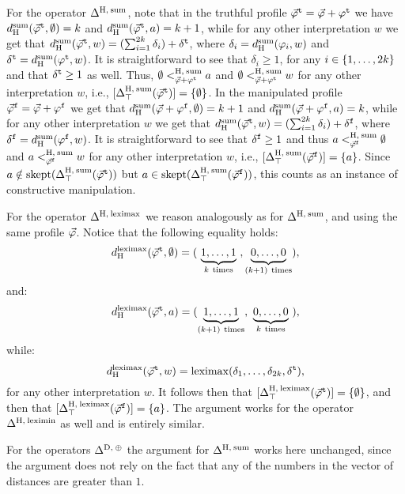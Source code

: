 \begin{prf*}{}{}
	For the operator $\me^{\hamming,\:\ssum}$,
	note that in the truthful profile $\truth{\P}=\P+\truth{\phi}$ we have 
	$\dd_{\hamming}^\ssum(\truth{\P},\emptyset)=k$ and 
	$\dd_{\hamming}^\ssum(\truth{\P},a)=k+1$,
	while for any other interpretation $w$ we get that 
	$\dd_{\hamming}^\ssum(\truth{\P},w)=(\sum_{i=1}^{2k}\delta_i)+\truth{\delta}$,
	where $\delta_i=\dd_{\hamming}^\ssum(\phi_i,w)$ 
	and $\truth{\delta}=\dd_{\hamming}^\ssum(\truth{\phi},w)$.
	It is straightforward to see that $\delta_i\geq 1$, 
	for any $i\in\set{1,\dots,2k}$ and that $\truth{\delta}\geq 1$ as well.
	Thus, $\emptyset <^{\hamming,\:\ssum}_{\P+\truth{\phi}} a$ 
	and $\emptyset <^{\hamming,\:\ssum}_{\P+\truth{\phi}} w$ for any other interpretation $w$,
	i.e., $[\me^{\hamming,\:\ssum}_{\top}(\truth{\P})]=\{\emptyset\}$.
	In the manipulated profile $\manip{\P}=\P+\manip{\phi}$ we get that
	$\dd_{\hamming}^\ssum(\P+\manip{\phi},\emptyset)=k+1$ 
	and $\dd_{\hamming}^\ssum(\P+\manip{\phi},a)=k$,
	while for any other interpretation $w$ we get that 
	$\dd_{\hamming}^\ssum(\truth{\P},w)=(\sum_{i=1}^{2k}\delta_i)+\manip{\delta}$,
	where $\manip{\delta}=\dd_{\hamming}^\ssum(\manip{\phi},w)$.
	It is straightforward to see that $\manip{\delta}\geq 1$ and
	thus $a <^{\hamming,\:\ssum}_{\manip{\P}} \emptyset$ and 
	$a <^{\hamming,\:\ssum}_{\manip{\P}} w$ for any other interpretation $w$,
	i.e., $[\me^{\hamming,\:\ssum}_{\top}(\manip{\P})]=\{a\}$.
	Since $a\notin\skept(\me^{\hamming,\:\ssum}_{\top}(\truth{\P}))$ 
	but $a\in\skept(\me^{\hamming,\:\ssum}_{\top}(\manip{\P}))$, 
	this counts as an instance of constructive manipulation.

	For the operator $\me^{\hamming,\:\leximax}$ 
	we reason analogously as for $\me^{\hamming,\:\ssum}$, 
	and using the same profile $\P$.
	Notice that the following equality holds:
	$$
		\dd_{\hamming}^\leximax(\truth{\P},\emptyset)=(~\underbrace{1,\dots,1}_{k~\text{times}}~,\underbrace{0,\dots,0}_{(k+1)~\text{times}}),
	$$ 
	and:
	$$
		\dd_{\hamming}^\leximax(\truth{\P},a)=(\underbrace{1,\dots,1}_{(k+1)~\text{times}},~\underbrace{0,\dots,0}_{k~\text{times}}~),
	$$
	while:
	$$
		\dd_{\hamming}^\leximax(\truth{\P},w)=\leximax(\delta_1,\dots,\delta_{2k},\truth{\delta}),
	$$ 
	for any other interpretation $w$.
	It follows then that $[\me^{\hamming,\:\leximax}_{\top}(\truth{\P})]=\{\emptyset\}$, 
	and then that $[\me^{\hamming,\:\leximax}_{\top}(\manip{\P})]=\set{a}$.
	The argument works for the operator $\me^{\hamming,\:\leximin}$
	as well and is entirely similar.

	For the operators $\me^{\drastic,\:\agg}$
	the argument for $\me^{\hamming,\:\ssum}$ works here unchanged, since the argument 
	does not rely on the fact that any of the numbers in the vector of distances are greater than $1$.
	

\end{prf*}
